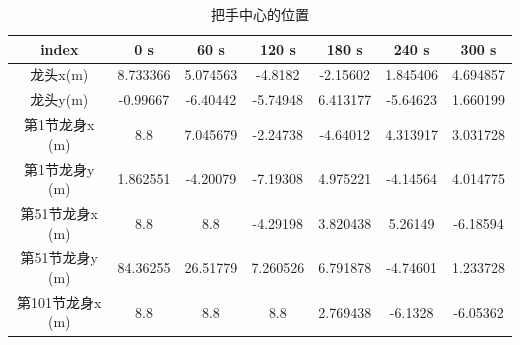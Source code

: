 \documentclass[withoutpreface, bwprint]{cumcmthesis} %
\begin{document}
\begin{table}[!h]
    \centering
    \caption{把手中心的位置}
    \label{tab:hand_center}
    \begin{tabular}{@{}ccccccc@{}}
        \toprule
        \multicolumn{1}{c}{\textbf{index}} & \multicolumn{1}{c}{\textbf{0 s}} & \multicolumn{1}{c}{\textbf{60 s}} & \multicolumn{1}{c}{\textbf{120 s}} & \multicolumn{1}{c}{\textbf{180 s}} & \multicolumn{1}{c}{\textbf{240 s}} & \multicolumn{1}{c}{\textbf{300 s}} \\ \midrule
        龙头x(m)                             & 8.733366                         & 5.074563                          & -4.8182                            & -2.15602                           & 1.845406                           & 4.694857                           \\
        龙头y(m)                             & -0.99667                         & -6.40442                          & -5.74948                           & 6.413177                           & -5.64623                           & 1.660199                           \\
        第1节龙身x (m)                         & 8.8                              & 7.045679                          & -2.24738                           & -4.64012                           & 4.313917                           & 3.031728                           \\
        第1节龙身y (m)                         & 1.862551                         & -4.20079                          & -7.19308                           & 4.975221                           & -4.14564                           & 4.014775                           \\
        第51节龙身x (m)                        & 8.8                              & 8.8                               & -4.29198                           & 3.820438                           & 5.26149                            & -6.18594                           \\
        第51节龙身y (m)                        & 84.36255                         & 26.51779                          & 7.260526                           & 6.791878                           & -4.74601                           & 1.233728                           \\
        第101节龙身x (m)                       & 8.8                              & 8.8                               & 8.8                                & 2.769438                           & -6.1328                            & -6.05362                           \\

\end{tabular}
\end{table}
\end{document}
